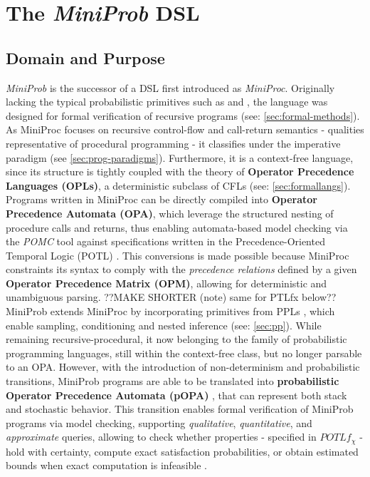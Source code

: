 \label{sec:miniprob}
\chapter{The \textit{MiniProb} DSL}
\section{Domain and Purpose}
\textit{MiniProb} is the successor of a DSL first introduced as \textit{MiniProc}\cite{miniproc}. Originally lacking the typical probabilistic
primitives such as  and , the language was designed for formal verification of recursive programs (see: \ref{sec:formal-methods}). As MiniProc focuses on recursive control-flow and
call-return semantics - qualities representative of procedural programming - it classifies under the imperative paradigm (see \ref{sec:prog-paradigms}). Furthermore, it is a
context-free language, since its structure is tightly coupled with the theory of \textbf{Operator Precedence Languages (OPLs)}, a deterministic subclass of CFLs (see: \ref{sec:formallangs}).
Programs written in MiniProc can be directly compiled into \textbf{Operator Precedence Automata (OPA)}, which leverage the structured nesting of procedure calls and
returns, thus enabling automata-based model checking via the \textit{POMC} tool against specifications written in the Precedence-Oriented Temporal Logic (POTL) \cite{miniproc}.
This conversions is made possible because MiniProc constraints its syntax to comply with the \textit{precedence relations} defined by a given
\textbf{Operator Precedence Matrix (OPM)}, allowing for deterministic and unambiguous parsing.
??MAKE SHORTER (note) same for PTLfx below??
\marginpar{}
\\

MiniProb extends MiniProc by incorporating primitives from PPLs \cite{POPACheck}, which enable sampling, conditioning and nested inference (see: \ref{sec:pp}).
While remaining recursive-procedural, it now belonging to the family of probabilistic programming languages, still within the context-free class, but no longer parsable to an OPA.
However, with the introduction of non-determinism and probabilistic transitions, MiniProb programs are able to be translated into
\textbf{probabilistic Operator Precedence  Automata (pOPA)} \cite{POPACheck,2025modelcheckingprobabilisticoperator}, that can represent both stack and stochastic behavior.
This transition enables formal verification of MiniProb programs via model checking, supporting \emph{qualitative}, \emph{quantitative}, and \emph{approximate} queries,
allowing to check whether properties - specified in $POTLf_\chi$ - hold with certainty, compute exact satisfaction probabilities, or obtain estimated bounds when exact computation is infeasible \cite{guideMiniProb}.

